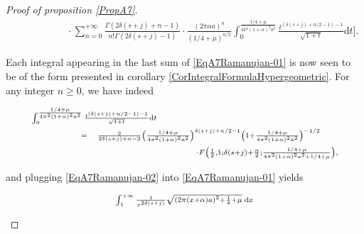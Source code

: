 \documentclass{jams-l}
\theoremstyle{definition}
\theoremstyle{remark}
\numberwithin{equation}{section}
\begin{document}
\begin{proof}[Proof of proposition \ref{PropA7}]
\begin{equation}
\begin{array}{lll}
                        && \qquad \qquad \scriptstyle \cdot \sum\limits_{n=0}^{+ \infty} \frac{\Gamma \left( 2 \delta \left( s + j \right) + n - 1 \right)}{n! \Gamma \left( 2 \delta \left( s + j \right) - 1 \right)} \cdot \frac{\left( 2 \pi \alpha a \right)^n}{\left( 1/4 + \mu \right)^{n/2}} \int_0^{\frac{1/4 + \mu}{4 \pi^2 \left( 1 + \alpha \right)^2 a^2}} \frac{t^{\left( \delta \left( s + j \right) + n/2 - 1 \right) - 1}}{\sqrt{1+t}} \mathrm{d}t \Big].
                    \end{array}
                \end{equation}
                
                \noindent Each integral appearing in the last sum of \eqref{EqA7Ramanujan-01} is now seen to be of the form presented in corollary \ref{CorIntegralFormulaHypergeometric}. For any integer $n \geqslant 0$, we have indeed
                
                \begin{equation}
                \label{EqA7Ramanujan-02}
                    \begin{array}{lll}
                        \multicolumn{3}{l}{\scriptstyle \int_0^{\frac{1/4 + \mu}{4 \pi^2 \left( 1 + \alpha \right)^2 a^2}} \frac{t^{\left( \delta \left( s + j \right) + n/2 - 1 \right) - 1}}{\sqrt{1+t}} \mathrm{d}t} \\[0.5em]
                        
                        \qquad \qquad & \scriptstyle = & \scriptstyle \frac{2}{2 \delta \left( s + j \right) + n - 2} \left( \frac{1/4 + \mu}{4 \pi^2 \left( 1 + \alpha \right)^2 a^2} \right)^{\delta \left( s + j \right) + n/2 - 1} \left( 1 + \frac{1/4 + \mu}{4 \pi^2 \left( 1 + \alpha \right)^2 a^2} \right)^{-1/2} \\[0.5em]
                        
                        && \qquad \qquad \qquad \qquad \qquad \scriptstyle \cdot F \left( \frac{1}{2}, 1; \delta \left( s + j \right) + \frac{n}{2}; \frac{1/4 + \mu}{4 \pi^2 \left( 1 + \alpha \right)^2 a^2 + 1/4 + \mu} \right),
                    \end{array}
                \end{equation}
                
                \noindent and plugging \eqref{EqA7Ramanujan-02} into \eqref{EqA7Ramanujan-01} yields
                
                \[ \begin{array}{lll}
                        \multicolumn{3}{l}{\scriptstyle \scriptstyle \int_1^{+ \infty} \frac{1}{x^{2 \delta \left( s+j \right)}} \sqrt{\left( 2 \pi \left( x + \alpha \right) a \right)^2 + \frac{1}{4} + \mu} \; \mathrm{d}x} \\[0.5em]
                        

\end{array}\]
\end{proof}
\end{document}
